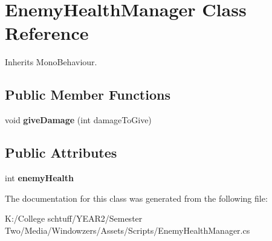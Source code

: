 \hypertarget{class_enemy_health_manager}{}\section{Enemy\+Health\+Manager Class Reference}
\label{class_enemy_health_manager}


Inherits Mono\+Behaviour.

\subsection*{Public Member Functions}
\begin{DoxyCompactItemize}
\item 
\mbox{\label{class_enemy_health_manager_acba9b4df14c84cb839cb9e523a27c236}} 
void {\bfseries give\+Damage} (int damage\+To\+Give)
\end{DoxyCompactItemize}
\subsection*{Public Attributes}
\begin{DoxyCompactItemize}
\item 
\mbox{\label{class_enemy_health_manager_ae3081a02e1f2ee94429a1d175858ee4a}} 
int {\bfseries enemy\+Health}
\end{DoxyCompactItemize}


The documentation for this class was generated from the following file\+:\begin{DoxyCompactItemize}
\item 
K\+:/\+College schtuff/\+Y\+E\+A\+R2/\+Semester Two/\+Media/\+Windowzers/\+Assets/\+Scripts/Enemy\+Health\+Manager.\+cs\end{DoxyCompactItemize}
